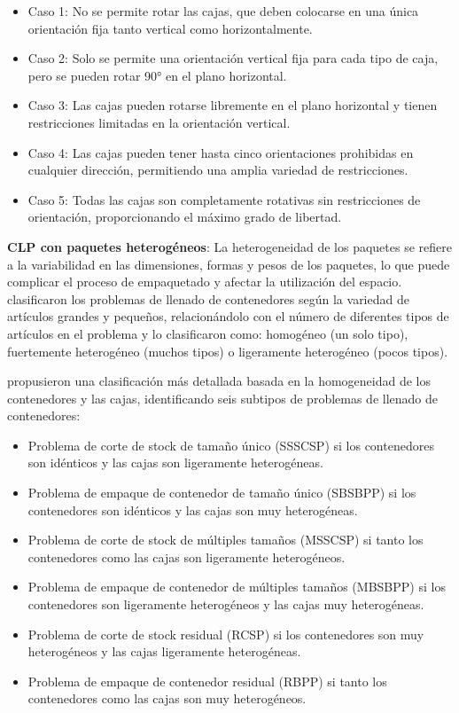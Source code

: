 \documentclass[openany]{article}
\begin{document}
\begin{itemize}
    \item Caso 1: No se permite rotar las cajas, que deben colocarse en una única orientación fija tanto vertical como horizontalmente.
    \item Caso 2: Solo se permite una orientación vertical fija para cada tipo de caja, pero se pueden rotar 90° en el plano horizontal.
    \item Caso 3: Las cajas pueden rotarse libremente en el plano horizontal y tienen restricciones limitadas en la orientación vertical.
    \item Caso 4: Las cajas pueden tener hasta cinco orientaciones prohibidas en cualquier dirección, permitiendo una amplia variedad de restricciones.
    \item Caso 5: Todas las cajas son completamente rotativas sin restricciones de orientación, proporcionando el máximo grado de libertad.
\end{itemize}

\textbf{CLP con paquetes heterogéneos}: La heterogeneidad de los paquetes se refiere a la variabilidad en las dimensiones, formas y pesos de los paquetes, lo que puede complicar el proceso de empaquetado y afectar la utilización del espacio. \textcite{WASCHER20071109} clasificaron los problemas de llenado de contenedores según la variedad de artículos grandes y pequeños, relacionándolo con el número de diferentes tipos de artículos en el problema y lo clasificaron como: homogéneo (un solo tipo), fuertemente heterogéneo (muchos tipos) o ligeramente heterogéneo (pocos tipos).

\textcite{zhao2016comparative} propusieron una clasificación más detallada basada en la homogeneidad de los contenedores y las cajas, identificando seis subtipos de problemas de llenado de contenedores:

\begin{itemize}
    \item Problema de corte de stock de tamaño único (SSSCSP) si los contenedores son idénticos y las cajas son ligeramente heterogéneas.
    \item Problema de empaque de contenedor de tamaño único (SBSBPP) si los contenedores son idénticos y las cajas son muy heterogéneas.
    \item Problema de corte de stock de múltiples tamaños (MSSCSP) si tanto los contenedores como las cajas son ligeramente heterogéneos.
    \item Problema de empaque de contenedor de múltiples tamaños (MBSBPP) si los contenedores son ligeramente heterogéneos y las cajas muy heterogéneas.
    \item Problema de corte de stock residual (RCSP) si los contenedores son muy heterogéneos y las cajas ligeramente heterogéneas.
    \item Problema de empaque de contenedor residual (RBPP) si tanto los contenedores como las cajas son muy heterogéneos.
\end{itemize}
\end{document}
